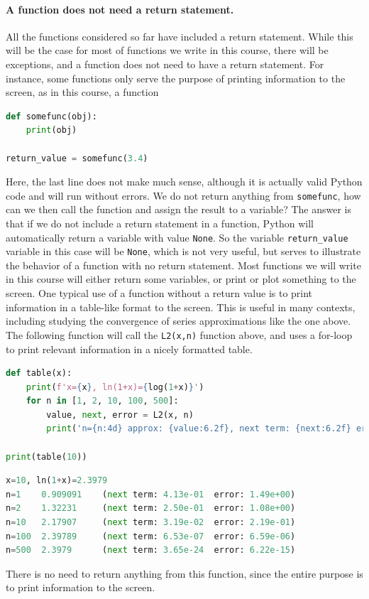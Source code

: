 \documentclass[graybox,envcountchap,sectrefs,final]{svmonodo}
\begin{document}
\paragraph{A function does not need a return statement.}
All the functions considered so far have included a return statement. While this will be the case for most of functions
we write in this course, there will be exceptions, and a function does not need to have a return statement.
For instance, some functions only serve
the purpose of printing information to the screen, as in
this course, a function
\begin{lstlisting}[language=Python,style=blue1]
def somefunc(obj):
    print(obj)

return_value = somefunc(3.4)
\end{lstlisting}
Here, the last line does not make much sense, although it is actually valid Python code and will run without errors.
We do not return anything from \texttt{somefunc}, how can we then call the function and assign the result to a variable? The
answer is that if we do not include a return statement in a function,  Python will automatically return a variable with
value \texttt{None}. So the variable \Verb!return_value! variable in this case will be \texttt{None}, which is not very useful, but serves
to illustrate the behavior of a function with no return statement.
Most functions we will write in this course will either
return some variables, or print or plot something to the screen. One typical use of a function without a return
value is to print information in a table-like format to the screen. This is useful in many contexts, including studying
the convergence of series approximations like the one above. The following function will call the \texttt{L2(x,n)} function above,
and uses a for-loop to print relevant information in a nicely formatted table.
\begin{lstlisting}[language=Python,style=blue1]
def table(x):
    print(f'x={x}, ln(1+x)={log(1+x)}')
    for n in [1, 2, 10, 100, 500]:
        value, next, error = L2(x, n)
        print('n={n:4d} approx: {value:6.2f}, next term: {next:6.2f} error: {error:6.2f}')

print(table(10))
\end{lstlisting}
\begin{lstlisting}[language=Python,style=gray]
x=10, ln(1+x)=2.3979
n=1    0.909091    (next term: 4.13e-01  error: 1.49e+00)
n=2    1.32231     (next term: 2.50e-01  error: 1.08e+00)
n=10   2.17907     (next term: 3.19e-02  error: 2.19e-01)
n=100  2.39789     (next term: 6.53e-07  error: 6.59e-06)
n=500  2.3979      (next term: 3.65e-24  error: 6.22e-15)
\end{lstlisting}
There is no need to return anything from this function, since the entire purpose is to print information to the screen.
\end{document}
